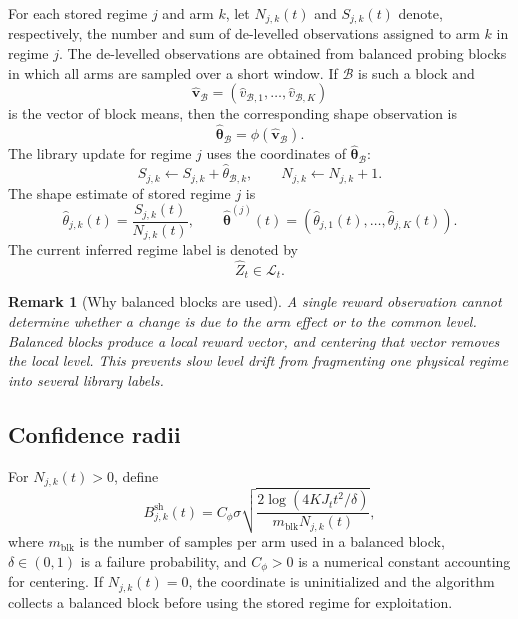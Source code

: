 \documentclass[11pt]{article}
\newtheorem{remark}{Remark}
\begin{document}
For each stored regime $j$ and arm $k$, let $N_{j,k}(t)$ and $S_{j,k}(t)$ denote, respectively, the number and sum of de-levelled observations assigned to arm $k$ in regime $j$. The de-levelled observations are obtained from balanced probing blocks in which all arms are sampled over a short window. If $\mathcal B$ is such a block and
\begin{equation}
\label{eq:block_vector}
\widehat{\bm v}_{\mathcal B}
=
(\widehat v_{\mathcal B,1},\ldots,\widehat v_{\mathcal B,K})
\end{equation}
is the vector of block means, then the corresponding shape observation is
\begin{equation}
\label{eq:block_shape}
\widehat{\bm\theta}_{\mathcal B}
=
\phi(\widehat{\bm v}_{\mathcal B}).
\end{equation}
The library update for regime $j$ uses the coordinates of $\widehat{\bm\theta}_{\mathcal B}$:
\begin{equation}
\label{eq:library_sum_update_shape}
S_{j,k}\leftarrow S_{j,k}+\widehat\theta_{\mathcal B,k},
\qquad
N_{j,k}\leftarrow N_{j,k}+1.
\end{equation}
The shape estimate of stored regime $j$ is
\begin{equation}
\label{eq:shape_estimate}
\widehat\theta_{j,k}(t)
=
\frac{S_{j,k}(t)}{N_{j,k}(t)},
\qquad
\widehat{\bm\theta}^{(j)}(t)
=
(\widehat\theta_{j,1}(t),\ldots,\widehat\theta_{j,K}(t)).
\end{equation}
The current inferred regime label is denoted by
\begin{equation}
\label{eq:current_regime}
\widehat Z_t\in\mathcal L_t.
\end{equation}

\begin{remark}[Why balanced blocks are used]
A single reward observation cannot determine whether a change is due to the arm effect or to the common level. Balanced blocks produce a local reward vector, and centering that vector removes the local level. This prevents slow level drift from fragmenting one physical regime into several library labels.
\end{remark}

\subsection{Confidence radii}
\label{subsec:confidence_radii}

For $N_{j,k}(t)>0$, define
\begin{equation}
\label{eq:shape_confidence_radius}
B_{j,k}^{\mathrm{sh}}(t)
=
C_{\phi}\sigma
\sqrt{
\frac{2\log(4KJ_t t^2/\delta)}{m_{\mathrm{blk}}N_{j,k}(t)}
},
\end{equation}
where $m_{\mathrm{blk}}$ is the number of samples per arm used in a balanced block, $\delta\in(0,1)$ is a failure probability, and $C_{\phi}>0$ is a numerical constant accounting for centering. If $N_{j,k}(t)=0$, the coordinate is uninitialized and the algorithm collects a balanced block before using the stored regime for exploitation.
\end{document}
